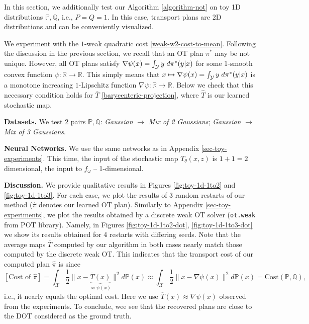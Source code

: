 \documentclass{article} %
\begin{document}
In this section, we additionally test our Algorithm \ref{algorithm-not} on toy 1D distributions $\mathbb{P},\mathbb{Q}$, i.e., $P=Q=1$. In this case, transport plans are 2D distributions and can be conveniently visualized.

We experiment with the $1$-weak quadratic cost \eqref{weak-w2-cost-to-mean}. Following the discussion in the previous section, we recall that an OT plan $\pi^{*}$ may be not unique. However, all OT plans satisfy ${\nabla\psi(x)=\int_{\mathcal{Y}}y \hspace{1mm} d\pi^{*}(y|x)}$ for some 1-smooth convex function $\psi:\mathbb{R}\rightarrow\mathbb{R}$. This simply means that $x\mapsto \nabla\psi(x)=\int_{\mathcal{Y}}y \hspace{1mm} d\pi^{*}(y|x)$ is a monotone increasing $1$-Lipschitz function $\nabla\psi:\mathbb{R}\rightarrow\mathbb{R}$. Below we check that this necessary condition holds for $\overline{T}$ \eqref{barycenteric-projection}, where $\hat{T}$ is our learned stochastic map.

\textbf{Datasets.} We test 2 pairs $\mathbb{P},\mathbb{Q}$: \textit{Gaussian} $\rightarrow$ \textit{Mix of 2 Gaussians}; \textit{Gaussian} $\rightarrow$ \textit{Mix of 3 Gaussians}.

\textbf{Neural Networks.} We use the same networks as in Appendix \ref{sec-toy-experiments}. This time, the input of the stochastic map $T_{\theta}(x,z)$ is $1+1=2$ dimensional, the input to $f_{\omega}$ -- 1-dimensional.

\textbf{Discussion.} We provide qualitative results in Figures \ref{fig:toy-1d-1to2} and \ref{fig:toy-1d-1to3}. For each case, we plot the results of 3 random restarts of our method ($\hat{\pi}$ denotes our learned OT plan). Similarly to Appendix \ref{sec-toy-experiments}, we plot the results obtained by a discrete weak OT solver (\texttt{ot.weak} from POT library). Namely, in Figures \ref{fig:toy-1d-1to2-dot}, \ref{fig:toy-1d-1to3-dot} we show its results obtained for 4 restarts with differing seeds. Note that the average maps $\overline{T}$ computed by our algorithm in both cases nearly match those computed by the discrete weak OT. This indicates that the transport cost of our computed plan $\hat{\pi}$ is since $$[\text{Cost of } \hat{\pi}]=\int_{\mathcal{X}}\frac{1}{2}\|x-\underbrace{\overline{T}(x)}_{\approx \psi(x)}\|^{2}d\mathbb{P}(x)\approx \int_{\mathcal{X}}\frac{1}{2}\|x-\nabla\psi(x)\|^{2}d\mathbb{P}(x)=\text{Cost}(\mathbb{P},\mathbb{Q}),$$
i.e., it nearly equals the optimal cost. Here we use $\overline{T}(x)\approx \nabla\psi(x)$ observed from the experiments. To conclude, wee see that the recovered plans are close to the DOT considered as the ground truth.
\end{document}
